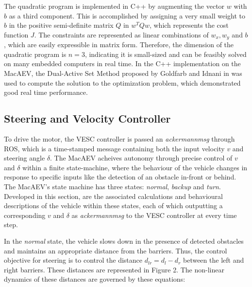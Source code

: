 \documentclass[conference]{IEEEtran}
\begin{document}
The quadratic program is implemented in C++ by augmenting the vector $w$ with $b$ as a third component. This is accomplished by assigning a very small weight to $b$ in the positive semi-definite matrix $Q$ in $w^T Q w$, which represents the cost function $J$. The constraints are represented as linear combinations of $w_x, w_y$ and $b$, which are easily expressible in matrix form. Therefore, the dimension of the quadratic program is $n=3$, indicating it is  small-sized and can be feasibly solved on many embedded computers in real time. In the C++ implementation on the MacAEV, the Dual-Active Set Method proposed by Goldfarb and Idnani in \cite{b8} was used to compute the solution to the optimization problem, which demonstrated good real time performance. 


\subsection{Steering and Velocity Controller}
To drive the motor, the VESC controller is passed an \textit{ackermann\textunderscore msg} through ROS, which is a time-stamped message containing both the input velocity $v$ and steering angle $\delta$. The MacAEV acheives autonomy through precise control of $v$ and $\delta$ within a finite state-machine, where the behaviour of the vehicle changes in response to specific inputs like the detection of an obstacle in-front or behind. The MacAEV's state machine has three states: \textit{normal}, \textit{backup} and \textit{turn}. Developed in this section, are the associated calculations and behavioural descriptions of the vehicle within these states, each of which outputting a corresponding $v$ and $\delta$ as \textit{ackermann\textunderscore msg} to the VESC controller at every time step.  


In the \textit{normal} state, the vehicle slows down in the presence of detected obstacles and maintains an appropriate distance from the barriers. Thus, the control objective for steering is to control the distance $d_{lr} = d_l - d_r$ between the left and right barriers. These distances are represented in Figure 2. The non-linear dynamics of these distances are governed by these equations:
\end{document}
